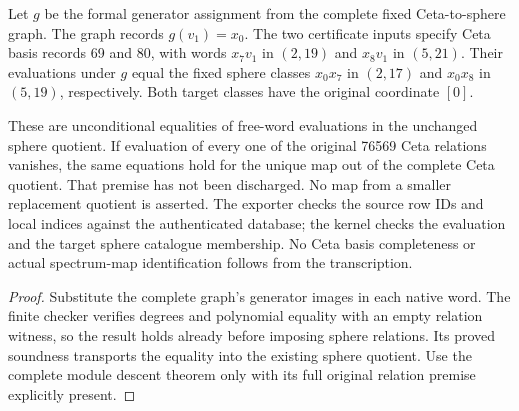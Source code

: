 \begin{lemma}
  \label{lem:lin-naturality-native-map-words}
  \leanok
  Let $g$ be the formal generator assignment from the complete fixed
  Ceta-to-sphere graph. The graph records $g(v_1)=x_0$.
  The two certificate inputs specify Ceta basis records 69 and 80,
  with words $x_7v_1$ in $(2,19)$ and $x_8v_1$ in $(5,21)$.
  Their evaluations under $g$ equal the fixed sphere classes
  $x_0x_7$ in $(2,17)$ and $x_0x_8$ in $(5,19)$, respectively.
  Both target classes have the original coordinate $[0]$.

  These are unconditional equalities of free-word evaluations in the
  unchanged sphere quotient. If evaluation of every one of the original
  76569 Ceta relations vanishes, the same equations hold for the unique
  map out of the complete Ceta quotient. That premise has not been
  discharged. No map from a smaller replacement quotient is asserted.
  The exporter checks the source row IDs and local indices against the
  authenticated database; the kernel checks the evaluation and the target
  sphere catalogue membership. No Ceta basis completeness or actual
  spectrum-map identification follows from the transcription.
\end{lemma}
\begin{proof}
  \leanok
  Substitute the complete graph's generator images in each native word.
  The finite checker verifies degrees and polynomial equality with an
  empty relation witness, so the result holds already before imposing
  sphere relations. Its proved soundness transports the equality into
  the existing sphere quotient. Use the complete module descent theorem
  only with its full original relation premise explicitly present.
\end{proof}

